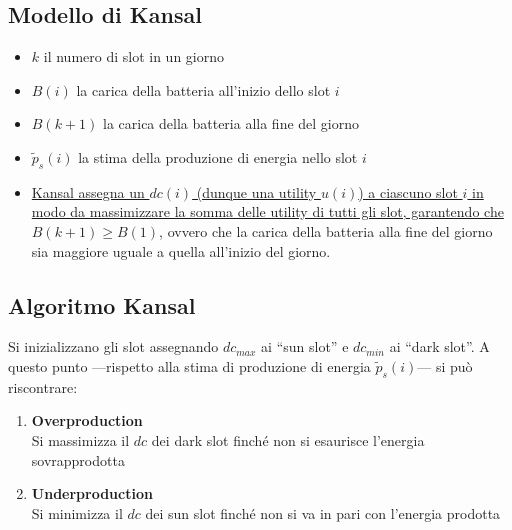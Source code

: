 
\subsection{Modello di Kansal}
\begin{itemize}
   \item $k$ il numero di slot in un giorno
   \item $B(i)$ la carica della batteria all'inizio dello slot $i$
   \item $B(k+1)$ la carica della batteria alla fine del giorno
   \item $\tilde{p}_s(i)$ la stima della produzione di energia nello slot $i$
   \item[] \ul{Kansal assegna un $dc(i)$ (dunque una utility $u(i)$) a ciascuno slot $i$ in modo da massimizzare la somma delle utility di tutti gli slot, garantendo che $B(k+1) \geq B(1)$}, ovvero che la carica della batteria alla fine del giorno sia maggiore uguale a quella all'inizio del giorno.
\end{itemize}

\subsection{Algoritmo Kansal}
Si inizializzano gli slot assegnando $dc_{max}$ ai ``sun slot'' e $dc_{min}$ ai ``dark slot''.
A questo punto ---rispetto alla stima di produzione di energia $\tilde{p}_s(i)$--- si può riscontrare:
\begin{enumerate}
   \item \textbf{Overproduction}\\
   Si massimizza il $dc$ dei dark slot finché non si esaurisce l'energia sovrapprodotta
   \item \textbf{Underproduction}\\
   Si minimizza il $dc$ dei sun slot finché non si va in pari con l'energia prodotta
\end{enumerate}
